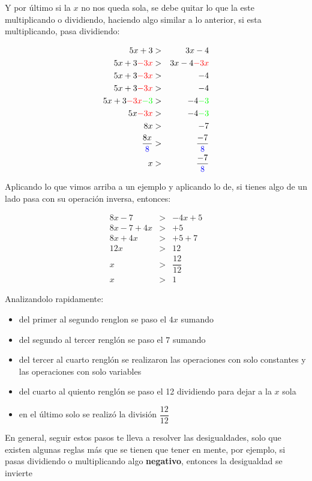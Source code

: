 \documentclass[paper=letter, fontsize=14pt]{scrartcl}
\numberwithin{equation}{section} %
\numberwithin{figure}{section} %
\numberwithin{table}{section} %
\begin{document}
Y por último si la $x$ no nos queda sola, se debe quitar lo que la este multiplicando o dividiendo, haciendo algo similar a lo anterior, si esta multiplicando, pasa dividiendo:

\begin{eqnarray*}
5x+3&>&3x-4\\
5x+3\textcolor{red}{-3x}&>&3x-4\textcolor{red}{-3x}\\
5x+3\textcolor{red}{-3x}&>&-4\\
5x+3\textcolor{red}{-3x}&>&-4\\
5x+3\textcolor{red}{-3x}\textcolor{green}{-3}&>&-4\textcolor{green}{-3}\\
5x\textcolor{red}{-3x}&>&-4\textcolor{green}{-3}\\
8x&>&-7\\
\dfrac{8x}{\textcolor{blue}{8}}&>&\dfrac{-7}{\textcolor{blue}{8}}\\
x&>&\dfrac{-7}{\textcolor{blue}{8}}\\
\end{eqnarray*}


Aplicando lo que vimos arriba a un ejemplo y aplicando lo de, si tienes algo de un lado pasa con su operación inversa, entonces:


\begin{eqnarray*} 
8x-7&>&-4x+5\\
8x-7+4x&>&+5\\
8x+4x&>&+5+7\\
12x&>&12\\
x&>&\dfrac{12}{12}\\
x&>&1
\end{eqnarray*}

Analizandolo rapidamente:
\begin{itemize}
\item del primer al segundo renglon se paso el $4x$ sumando
\item del segundo al tercer renglón se paso el $7$ sumando
\item del tercer al cuarto renglón se realizaron las operaciones con solo constantes y las operaciones con solo variables
\item del cuarto al quiento renglón se paso el 12 dividiendo para dejar a la $x$ sola
\item en el último solo se realizó la división $\dfrac{12}{12}$
\end{itemize}


En general, seguir estos pasos te lleva a resolver las desigualdades, solo que existen algunas reglas más que se tienen que tener en mente, por ejemplo, si pasas dividiendo o multiplicando algo \textbf{negativo}, entonces la desigualdad se invierte
\end{document}
